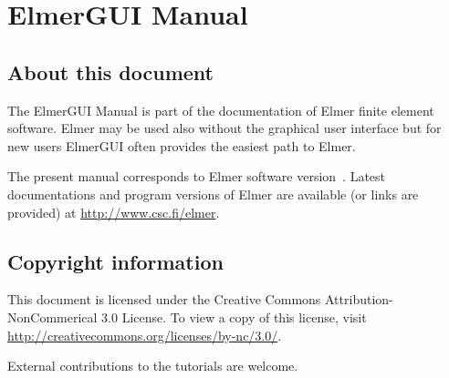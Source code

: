 \chapter*{ElmerGUI Manual}

\section*{About this document}

The ElmerGUI Manual is part of the documentation of 
Elmer finite element software. Elmer may be used also without the
graphical user interface but for new users ElmerGUI often
provides the easiest path to Elmer. 

The present manual
corresponds to Elmer software version~\elmerversion{}.
Latest documentations and program versions of Elmer are available (or links are provided) at 
\url{http://www.csc.fi/elmer}. 

\section*{Copyright information}

This document is licensed under the Creative Commons Attribution-NonCommerical 3.0 License. 
To view a copy of this license, visit \url{http://creativecommons.org/licenses/by-nc/3.0/}.

External contributions to the tutorials are welcome. 


